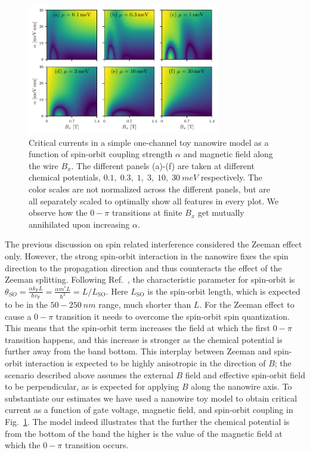 \begin{figure}
\centering
\includegraphics[width=0.75\textwidth]{chapter_supercurrent/figures/sup_fig7}
\caption{Critical currents in a simple one-channel toy nanowire model\cite{Lutchyn2010,Oreg2010} as a function of spin-orbit coupling strength $\alpha$ and magnetic field along the wire $B_x$.
The different panels (a)-(f) are taken at different chemical potentials, $0.1,\; 0.3,\; 1,\; 3,\; 10,\; \SI{30}{meV}$ respectively.
The color scales are not normalized across the different panels, but are all separately scaled to optimally show all features in every plot.
We observe how the $0-\pi$ transitions at finite $B_x$ get mutually annihilated upon increasing $\alpha$.\label{fig:currents_1D_alpha_vs_B_x}}
\end{figure}

The previous discussion on spin related interference considered the Zeeman effect only.
However, the strong spin-orbit interaction in the nanowire fixes the spin direction to the propagation direction and thus counteracts the effect of the Zeeman splitting. 
Following Ref.~\cite{Yokoyama2014}, the characteristic parameter for spin-orbit is $\theta_{SO} = \frac{\alpha k_\mathrm{F} L}{\hbar v_\mathrm{F}} = \frac{\alpha m^* L}{\hbar^2} = L/L_\mathrm{SO}$.
Here $L_\mathrm{SO}$ is the spin-orbit length, which is expected to be in the $50-\SI{250}{nm}$ range, much shorter than $L$.
For the Zeeman effect to cause a $0-\pi$ transition it needs to overcome the spin-orbit spin quantization. 
This means that the spin-orbit term increases the field at which the first $0-\pi$ transition happens, and this increase is stronger as the chemical potential is further away from the band bottom.
This interplay between Zeeman and spin-orbit interaction is expected to be highly anisotropic\cite{Yokoyama2014} in the direction of $B$; the scenario described above assumes the external $B$ field and effective spin-orbit field to be perpendicular, as is expected for applying $B$ along the nanowire axis.
To substantiate our estimates we have used a nanowire toy model\cite{Lutchyn2010,Oreg2010} to obtain critical current as a function of gate voltage, magnetic field, and spin-orbit coupling in Fig.~\ref{fig:currents_1D_alpha_vs_B_x}.
The model indeed illustrates that the further the chemical potential is from the bottom of the band the higher is the value of the magnetic field at which the $0-\pi$ transition occurs. 

